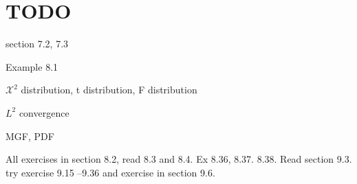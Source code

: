 \section{TODO}

section 7.2, 7.3

Example 8.1

$\mathcal{X}^2$ distribution, t distribution, F distribution


$L^2$ convergence

MGF, PDF

All exercises in section 8.2, read 8.3 and 8.4. Ex 8.36, 8.37. 8.38. Read section 9.3.
try exercise 9.15 –9.36 and exercise in section 9.6.